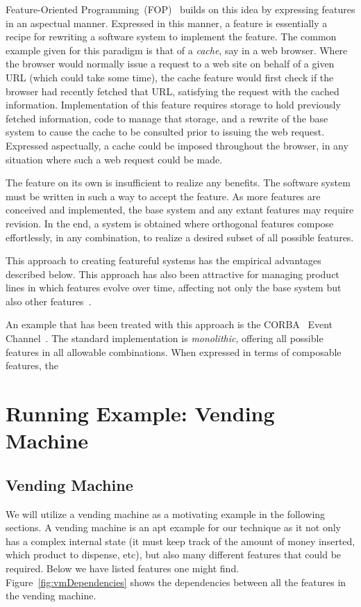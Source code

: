 \documentclass[sigplan,anonymous,review]{acmart}
\begin{document}
Feature-Oriented Programming~(FOP)~\cite{prehofer1997feature} builds on this idea by expressing features in an aspectual manner.   Expressed in this manner, a feature is essentially a recipe for rewriting a software system to implement the feature.   The common example given for this paradigm is that of a \emph{cache}, say in a web browser.  Where the browser would normally issue a request to a web site on behalf of a given URL (which could take some time), the cache feature would first check if the browser had recently fetched that URL, satisfying the request with the cached information. Implementation of this feature requires storage to hold previously fetched information, code to manage that storage, and a rewrite of the base system to cause the cache to be consulted prior to issuing the web request.  Expressed aspectually, a cache could be imposed throughout the browser, in any situation where such a web request could be made.

The feature on its own is insufficient to realize any benefits.  The software system must be written in such a way to accept the feature. As more features are conceived and implemented, the base system and any extant features may require revision.   In the end, a system is obtained where orthogonal features compose effortlessly, in any combination, to realize a desired subset of all possible features.

This approach to creating featureful systems has the empirical advantages described below. This approach has also been attractive for managing product lines in which features evolve over time, affecting not only the base system but also other features~\cite{10.1145/2897695.2897701}.

An example that has been treated with this approach is the CORBA~\cite{} Event Channel~\cite{}.  The standard implementation is \emph{monolithic}, offering all possible features in all allowable combinations.    
When expressed in terms of composable features, the 

\section{Running Example: Vending Machine}
\subsection{Vending Machine}\label{sec:vend}
We will utilize a vending machine as a motivating example in the following sections. A vending machine is an apt example for our technique as it not only has a complex internal state (it must keep track of the amount of money inserted, which product to dispense, etc), but also many different features that could be required. Below we have listed features one might find. Figure~\ref{fig:vmDependencies} shows the dependencies between all the features in the vending machine.
\end{document}
